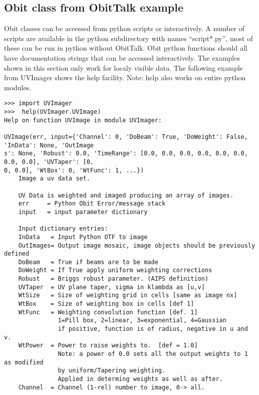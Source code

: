 \documentclass[11pt]{report}
\begin{document}
\subsection{Obit class from ObitTalk example}
Obit classes  can be accessed from python scripts or interactively.
A number of scripts are available in the python subdirectory 
with names ``script*.py'', most of these can be run in python without ObitTalk.
Obit python functions  should all have documentation strings that can
be accessed interactively. 
The examples shown in this section only work for localy visible data.
The following example from UVImager shows the help facility.
Note: help also works on entire python modules.
\begin{verbatim}
>>> import UVImager
>>>  help(UVImager.UVImage)
Help on function UVImage in module UVImager:

UVImage(err, input={'Channel': 0, 'DoBeam': True, 'DoWeight': False, 'InData': None, 'OutImage
s': None, 'Robust': 0.0, 'TimeRange': [0.0, 0.0, 0.0, 0.0, 0.0, 0.0, 0.0, 0.0], 'UVTaper': [0.
0, 0.0], 'WtBox': 0, 'WtFunc': 1, ...})
    Image a uv data set.
    
    UV Data is weighted and imaged producing an array of images.
    err     = Python Obit Error/message stack
    input   = input parameter dictionary
    
    Input dictionary entries:
    InData   = Input Python OTF to image
    OutImages= Output image mosaic, image objects should be previously defined
    DoBeam   = True if beams are to be made
    DoWeight = If True apply uniform weighting corrections
    Robust   = Briggs robust parameter. (AIPS definition)
    UVTaper  = UV plane taper, sigma in klambda as [u,v]
    WtSize   = Size of weighting grid in cells [same as image nx]
    WtBox    = Size of weighting box in cells [def 1]
    WtFunc   = Weighting convolution function [def. 1]
               1=Pill box, 2=linear, 3=exponential, 4=Gaussian
               if positive, function is of radius, negative in u and v.
    WtPower  = Power to raise weights to.  [def = 1.0]
               Note: a power of 0.0 sets all the output weights to 1 as modified
               by uniform/Tapering weighting.
               Applied in determing weights as well as after.
    Channel  = Channel (1-rel) number to image, 0-> all.
\end{verbatim}
\end{document}
